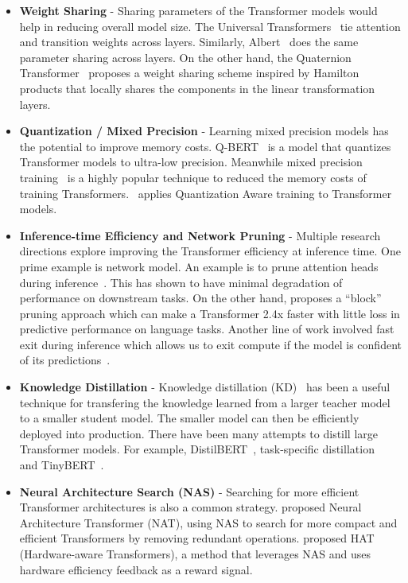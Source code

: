 \begin{itemize}
\item \textbf{Weight Sharing} - Sharing parameters of the Transformer models would help in reducing overall model size. The Universal Transformers~\citep{dehghani2018universal} tie attention and transition weights across layers. Similarly, Albert~\citep{lan2019albert} does the same parameter sharing across layers. On the other hand, the Quaternion Transformer~\citep{tay2019lightweight} proposes a weight sharing scheme inspired by Hamilton products that locally shares the components in the linear transformation layers.

\item \textbf{Quantization / Mixed Precision} - Learning mixed precision models has the potential to improve memory costs. Q-BERT~\citep{shen2020q} is a model that quantizes Transformer models to ultra-low precision. Meanwhile mixed precision training~\citep{ott2019fairseq} is a highly popular technique to reduced the memory costs of training Transformers.~\citet{fan2020training} applies Quantization Aware training to Transformer models. 

\item \textbf{Inference-time Efficiency and Network Pruning} - Multiple research directions explore improving the Transformer efficiency at inference time. One prime example is network model. An example is to prune attention heads during inference~\citep{voita-etal-2019-analyzing,michel2019sixteen}. This has shown to have minimal degradation of performance on downstream tasks. On the other hand, \citet{lagunas2021block} proposes a ``block'' pruning approach which can make a Transformer 2.4x faster with little loss in predictive performance on language tasks. Another line of work involved fast exit during inference which allows us to exit compute if the model is confident of its predictions~\citep{schuster-etal-2021-consistent}. 

\item \textbf{Knowledge Distillation} - Knowledge distillation (KD)~\citep{hinton2015distilling} has been a useful technique for transfering the knowledge learned from a larger teacher model to a smaller student model. The smaller model can then be efficiently deployed into production. There have been many attempts to distill large Transformer models. For example, DistilBERT~\citep{sanh2019distilbert}, task-specific distillation~\citep{tang2019distilling} and TinyBERT~\citep{jiao2019tinybert}.

\item \textbf{Neural Architecture Search (NAS)} - Searching for more efficient Transformer architectures is also a common strategy. \citet{guo2019nat} proposed Neural Architecture Transformer (NAT), using NAS to search for more compact and efficient Transformers by removing redundant operations. \citet{wang2020hat} proposed HAT (Hardware-aware Transformers), a method that leverages NAS and uses hardware efficiency feedback as a reward signal.


\end{itemize}
